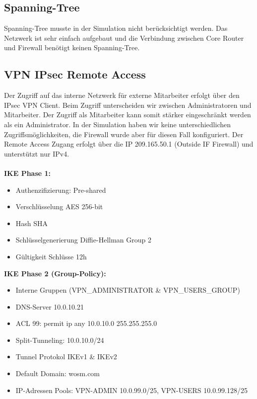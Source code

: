 \documentclass[11pt,a4paper,parskip=half]{scrartcl}
\begin{document}
\subsection{Spanning-Tree}
Spanning-Tree musste in der Simulation nicht berücksichtigt werden. Das Netzwerk ist sehr einfach aufgebaut und die Verbindung zwischen Core Router und Firewall benötigt keinen Spanning-Tree.

\subsection{VPN IPsec Remote Access}
Der Zugriff auf das interne Netzwerk für externe Mitarbeiter erfolgt über den IPsec VPN Client. Beim Zugriff unterscheiden wir zwischen Administratoren und Mitarbeiter. Der Zugriff als Mitarbeiter kann somit stärker eingeschränkt werden als ein Administrator. In der Simulation haben wir keine unterschiedlichen Zugriffsmöglichkeiten, die Firewall wurde aber für diesen Fall konfiguriert. Der Remote Access Zugang erfolgt über die IP 209.165.50.1 (Outside IF Firewall) und unterstützt nur IPv4.\\
\\
\textbf{IKE Phase 1:}
\begin{itemize}
	\item{Authenzifizierung: Pre-shared}
	\item{Verschlüsselung AES 256-bit}
	\item{Hash SHA}
	\item{Schlüsselgenerierung Diffie-Hellman Group 2}
	\item{Gültigkeit Schlüsse 12h}
\end{itemize}

\textbf{IKE Phase 2 (Group-Policy):}
\begin{itemize}
	\item{Interne Gruppen (VPN\_ADMINISTRATOR \& VPN\_USERS\_GROUP)}
	\item{DNS-Server 10.0.10.21}
	\item{ACL 99: permit ip any 10.0.10.0 255.255.255.0 }
	\item{Split-Tunneling: 10.0.10.0/24}
	\item{Tunnel Protokol IKEv1 \& IKEv2}
	\item{Default Domain: wosm.com}
	\item{IP-Adressen Pools: VPN-ADMIN 10.0.99.0/25, VPN-USERS 10.0.99.128/25}
\end{itemize}
\end{document}
